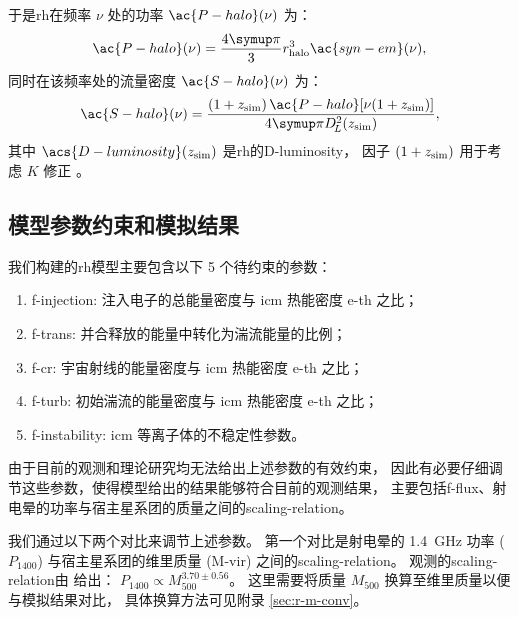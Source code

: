 于是\ac{rh}在频率 $\nu$ 处的功率 $\ac{P-halo}(\nu)$ 为：
\begin{equation}
  \label{eq:halo-power}
  \ac{P-halo}(\nu) = \frac{4\Cpi}{3} r_{\R{halo}}^3 \ac{syn-em}(\nu) ,
\end{equation}
同时在该频率处的流量密度 $\ac{S-halo}(\nu)$ 为：
\begin{equation}
  \label{eq:halo-flux}
  \ac{S-halo}(\nu) =
    \frac{(1+z_{\R{sim}}) \,\ac{P-halo}[\nu(1+z_{\R{sim}})]}{
      4\Cpi D_{\!L}^2(z_{\R{sim}})} ,
\end{equation}
其中
$\acs{D-luminosity}(z_{\R{sim}})$ 是\ac{rh}的\acl{D-luminosity}，
因子 $(1 + z_{\mathrm{sim}})$ 用于考虑 $K$ 修正 \cite{hogg1999}。

\subsection{模型参数约束和模拟结果}
\label{sec:halo-results}

我们构建的\ac{rh}模型主要包含以下 5 个待约束的参数：
\begin{enumerate}
  \item \ac{f-injection}:
    注入电子的总能量密度与 \ac{icm} 热能密度 \ac{e-th} 之比；
  \item \ac{f-trans}:
    并合释放的能量中转化为湍流能量的比例；
  \item \ac{f-cr}:
    宇宙射线的能量密度与 \ac{icm} 热能密度 \ac{e-th} 之比；
  \item \ac{f-turb}:
    初始湍流的能量密度与 \ac{icm} 热能密度 \ac{e-th} 之比；
  \item \ac{f-instability}:
    \ac{icm} 等离子体的不稳定性参数。
\end{enumerate}
由于目前的观测和理论研究均无法给出上述参数的有效约束，
因此有必要仔细调节这些参数，使得模型给出的结果能够符合目前的观测结果，
主要包括\ac{f-flux}、射电晕的功率与宿主星系团的质量之间的\ac{scaling-relation}。

我们通过以下两个对比来调节上述参数。
第一个对比是射电晕的 \SI{1.4}{\GHz} 功率 ($P_{1400}$)
与宿主星系团的维里质量 (\ac{M-vir}) 之间的\ac{scaling-relation}。
观测的\ac{scaling-relation}由  给出：
$P_{1400} \propto M_{500}^{3.70 \pm 0.56}$。
这里需要将质量 $M_{500}$ 换算至维里质量以便与模拟结果对比，
具体换算方法可见附录 \autoref{sec:r-m-conv}。

